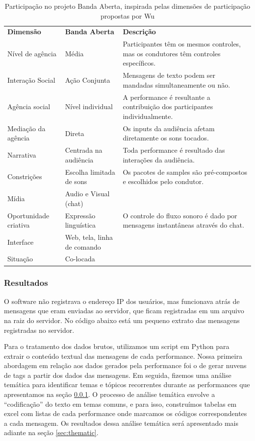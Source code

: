 \begin{table}[ht!]
\ABNTEXfontereduzida
\setlength\extrarowheight{-2pt}
\caption{Participação no projeto Banda Aberta, inspirada pelas dimensões de participação propostas por Wu \cite{wu2017open}}{%
\begin{tabular}{p{3cm}p{3cm}p{4cm}}
\hline
\textbf{Dimensão } & \textbf{Banda Aberta} & \textbf{Descrição} \\
Nível de agência & Média & Participantes têm os mesmos controles, mas os condutores têm controles específicos.\\
Interação Social & Ação Conjunta & Mensagens de texto podem ser mandadas simultaneamente ou não.\\
Agência social  & Nível individual & A performance é resultante a contribuição dos participantes individualmente.\\
Mediação da agência & Direta & Os inputs da audiência afetam diretamente os sons tocados. \\
Narrativa & Centrada na audiência & Toda performance é resultado das interações da audiência.\\
Constrições & Escolha limitada de sons & Os pacotes de samples são pré-compostos e escolhidos pelo condutor.\\
Mídia & Audio e Visual (chat) & \\
Oportunidade criativa & Expressão linguística & O controle do fluxo sonoro é dado por mensagens instantâneas através do chat.\\
Interface & Web, tela, linha de comando & \\
Situação & Co-locada & \\
\hline
\end{tabular}}
\label{tab:participation}
\end{table}

\newpage

\subsubsection{Resultados}

O software não registrava o endereço IP dos usuários, mas funcionava atrás de mensagens que eram enviadas ao servidor, que ficam registradas em um arquivo na raiz do servidor. No código abaixo está um pequeno extrato das mensagens registradas no servidor. 




Para o tratamento dos dados brutos, utilizamos um script em Python para extrair o conteúdo textual das mensagens de cada performance. Nossa primeira abordagem em relação aos dados gerados pela performance foi o de gerar nuvens de tags a partir dos dados das mensagens. Em seguida, fizemos uma análise temática \cite{Braun2006} para identificar temas e tópicos recorrentes durante as performances que apresentamos na seção \ref{}. O processo de análise temática envolve a ``codificação'' do texto em temas comuns, e para isso, construímos tabelas em excel com listas de cada performance onde marcamos os códigos correspondentes a cada mensagem. Os resultados dessa análise temática será apresentado mais adiante na seção \ref{sec:thematic}. 

